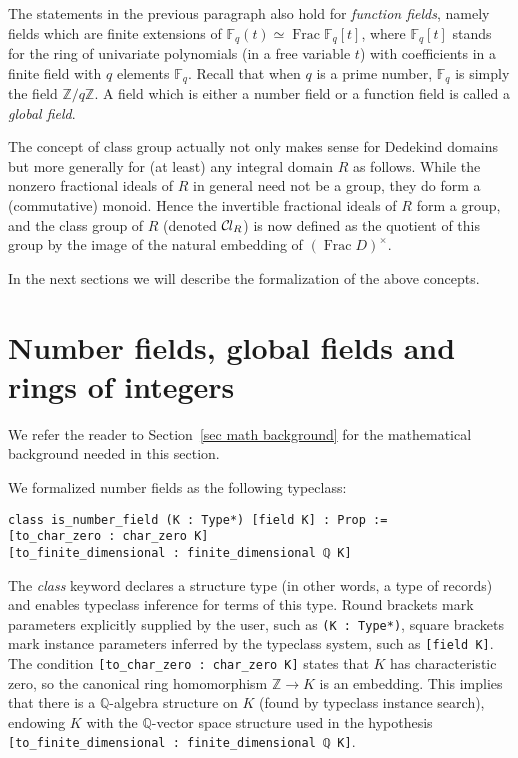 \documentclass[sn-mathphys]{sn-jnl}%
\newcommand{\lean}[1]{\texttt{#1}\xspace}
\newcommand*{\Cl}{\mathcal{C}\kern-.075em l}
\newcommand*{\Fq}[1][q]{\mathbb{F}_{#1}}
\newcommand{\QQ}{\mathbb{Q}}
\renewcommand{\Z}{\mathbb{Z}}
\DeclareMathOperator{\Frac}{Frac}
\begin{document}
The statements in the previous paragraph also hold for \emph{function fields}, namely fields which are finite extensions of $\Fq(t) \simeq \Frac \Fq[q][t]$, where $\Fq[q][t]$ stands for the ring of univariate polynomials (in a free variable $t$) with coefficients in a finite field with $q$ elements $\Fq$. Recall that when $q$ is a prime number, $\Fq$ is simply the field $\Z/q\Z$.
A field which is either a number field or a function field is called a \emph{global field}.

The concept of class group actually not only makes sense for Dedekind domains but more generally for (at least) any integral domain $R$ as follows. While the nonzero fractional ideals of $R$ in general need not be a group, they do form a (commutative) monoid. Hence the invertible fractional ideals of $R$ form a group, and the class group of $R$ (denoted $\Cl_{R}$) is now defined as the quotient of this group by the image of the natural embedding of $(\Frac D)^\times$.

In the next sections we will describe the formalization of the above concepts.

\section{Number fields, global fields and rings of integers} \label{sec:number fields}

We refer the reader to Section~\ref{sec math background} for the mathematical background needed in this section.

We formalized number fields as the following typeclass:
\begin{lstlisting}
class is_number_field (K : Type*) [field K] : Prop :=
[to_char_zero : char_zero K]
[to_finite_dimensional : finite_dimensional ℚ K]
\end{lstlisting}
The \emph{class} keyword declares a structure type (in other words, a type of records) and enables typeclass inference for terms of this type.
Round brackets mark parameters explicitly supplied by the user, such as \lean{(K : Type*)},
square brackets mark instance parameters inferred by the typeclass system, such as \mbox{\lean{[field K]}}.
The condition \lean{[to\_char\_zero : char\_zero K]} states that $K$ has characteristic zero, so the canonical ring homomorphism $\Z \to K$ is an embedding.
This implies that there is a $\QQ$-algebra structure on $K$ (found by typeclass instance search), endowing $K$ with the $\QQ$-vector space structure used in the hypothesis \mbox{\lean{[to\_finite\_dimensional : finite\_dimensional ℚ K]}}.
\end{document}
